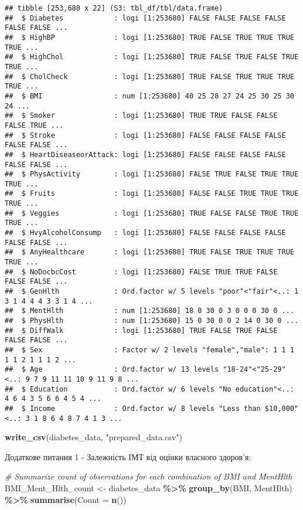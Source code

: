 \documentclass[
]{article}
\newenvironment{Shaded}{\begin{snugshade}}{\end{snugshade}}
\newcommand{\AttributeTok}[1]{\textcolor[rgb]{0.13,0.29,0.53}{#1}}
\newcommand{\CommentTok}[1]{\textcolor[rgb]{0.56,0.35,0.01}{\textit{#1}}}
\newcommand{\FunctionTok}[1]{\textcolor[rgb]{0.13,0.29,0.53}{\textbf{#1}}}
\newcommand{\NormalTok}[1]{#1}
\newcommand{\OtherTok}[1]{\textcolor[rgb]{0.56,0.35,0.01}{#1}}
\newcommand{\SpecialCharTok}[1]{\textcolor[rgb]{0.81,0.36,0.00}{\textbf{#1}}}
\newcommand{\StringTok}[1]{\textcolor[rgb]{0.31,0.60,0.02}{#1}}
\begin{document}
\begin{verbatim}
## tibble [253,680 x 22] (S3: tbl_df/tbl/data.frame)
##  $ Diabetes            : logi [1:253680] FALSE FALSE FALSE FALSE FALSE FALSE ...
##  $ HighBP              : logi [1:253680] TRUE FALSE TRUE TRUE TRUE TRUE ...
##  $ HighChol            : logi [1:253680] TRUE FALSE TRUE FALSE TRUE TRUE ...
##  $ CholCheck           : logi [1:253680] TRUE FALSE TRUE TRUE TRUE TRUE ...
##  $ BMI                 : num [1:253680] 40 25 28 27 24 25 30 25 30 24 ...
##  $ Smoker              : logi [1:253680] TRUE TRUE FALSE FALSE FALSE TRUE ...
##  $ Stroke              : logi [1:253680] FALSE FALSE FALSE FALSE FALSE FALSE ...
##  $ HeartDiseaseorAttack: logi [1:253680] FALSE FALSE FALSE FALSE FALSE FALSE ...
##  $ PhysActivity        : logi [1:253680] FALSE TRUE FALSE TRUE TRUE TRUE ...
##  $ Fruits              : logi [1:253680] FALSE FALSE TRUE TRUE TRUE TRUE ...
##  $ Veggies             : logi [1:253680] TRUE FALSE FALSE TRUE TRUE TRUE ...
##  $ HvyAlcoholConsump   : logi [1:253680] FALSE FALSE FALSE FALSE FALSE FALSE ...
##  $ AnyHealthcare       : logi [1:253680] TRUE FALSE TRUE TRUE TRUE TRUE ...
##  $ NoDocbcCost         : logi [1:253680] FALSE TRUE TRUE FALSE FALSE FALSE ...
##  $ GenHlth             : Ord.factor w/ 5 levels "poor"<"fair"<..: 1 3 1 4 4 4 3 3 1 4 ...
##  $ MentHlth            : num [1:253680] 18 0 30 0 3 0 0 0 30 0 ...
##  $ PhysHlth            : num [1:253680] 15 0 30 0 0 2 14 0 30 0 ...
##  $ DiffWalk            : logi [1:253680] TRUE FALSE TRUE FALSE FALSE FALSE ...
##  $ Sex                 : Factor w/ 2 levels "female","male": 1 1 1 1 1 2 1 1 1 2 ...
##  $ Age                 : Ord.factor w/ 13 levels "18-24"<"25-29"<..: 9 7 9 11 11 10 9 11 9 8 ...
##  $ Education           : Ord.factor w/ 6 levels "No education"<..: 4 6 4 3 5 6 6 4 5 4 ...
##  $ Income              : Ord.factor w/ 8 levels "Less than $10,000"<..: 3 1 8 6 4 8 7 4 1 3 ...
\end{verbatim}

\begin{Shaded}
\begin{Highlighting}[]
\FunctionTok{write\_csv}\NormalTok{(diabetes\_data, }\StringTok{"prepared\_data.csv"}\NormalTok{)}
\end{Highlighting}
\end{Shaded}

Додаткове питання 1 - Залежність ІМТ від оцінки власного здоров'я:

\begin{Shaded}
\begin{Highlighting}[]
\CommentTok{\# Summarize count of observations for each combination of BMI and MentHlth}
\NormalTok{BMI\_Ment\_Hlth\_count }\OtherTok{\textless{}{-}}\NormalTok{ diabetes\_data }\SpecialCharTok{\%\textgreater{}\%}
  \FunctionTok{group\_by}\NormalTok{(BMI, MentHlth) }\SpecialCharTok{\%\textgreater{}\%}
  \FunctionTok{summarise}\NormalTok{(}\AttributeTok{Count =} \FunctionTok{n}\NormalTok{())}
\end{Highlighting}
\end{Shaded}
\end{document}
